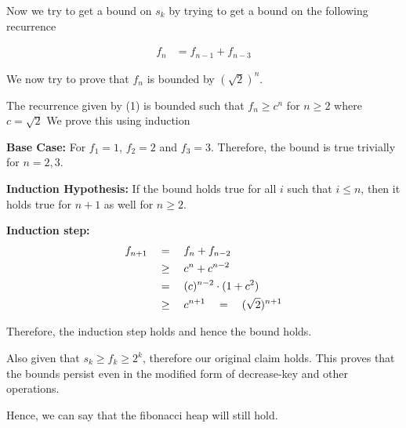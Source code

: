 \documentclass{article}
\begin{document}
\begin{question}
\begin{qproof}
	Now we try to get a bound on $s_k$ by trying to get a bound on the following recurrence \br%

	\begin{align}
		f_n &= f_{n-1} + f_{n-3}
	\end{align} \br%

	We now try to prove that $f_n$ is bounded by $(\sqrt{2})^n$.
	\clearpage

	\begin{qproof}{The recurrence given by (1) is bounded such that $f_n \geq c^n$ for $n \geq 2$ where $c = \sqrt{2}$}
		We prove this using induction \br%

		 \br%

		\textbf{Base Case:} For $f_1 = 1$, $f_2 = 2$ and $f_3 = 3$. Therefore, the bound is true trivially for $n = 2, 3$. \br%

		\textbf{Induction Hypothesis:} If the bound holds true for all $i$ such that $i \leq n$, then it holds true for $n+1$ as well for $n \geq 2$. \br%

		\textbf{Induction step:}
		\begin{align*}
			f_{n+1}	&\quad = \quad	f_n + f_{n-2} \\
					&\quad \ge \quad	c^n + c^{n-2} \\
					&\quad = \quad	(c)^{n-2} \cdot (1 + c^2) \\
					&\quad \ge \quad c^{n+1} \quad = \quad (\sqrt{2})^{n + 1}
		\end{align*}

		Therefore, the induction step holds and hence the bound holds.

	\end{qproof}

	Also given that $s_k \geq f_k \geq 2^k$, therefore our original claim holds. This proves that the bounds persist even in the modified form of decrease-key and other operations.

	\end{qproof}

	Hence, we can say that the fibonacci heap will still hold.


\end{question}
\end{document}
